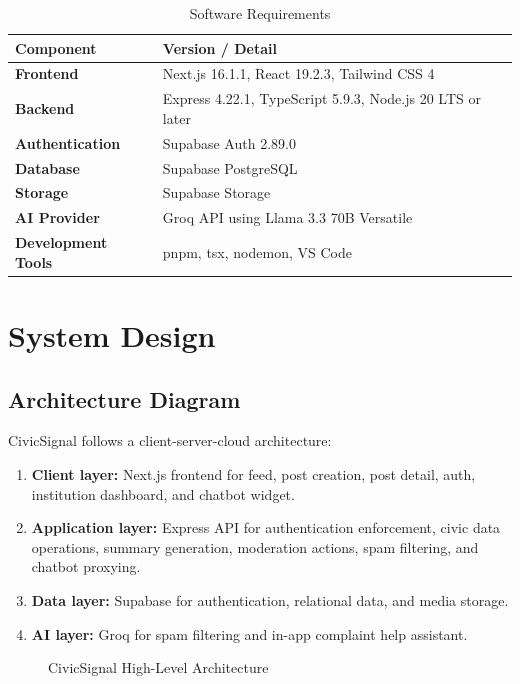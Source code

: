 \documentclass[12pt,a4paper]{report}
\begin{document}
\begin{table}[H]
\centering
\caption{Software Requirements}
\begin{tabularx}{\textwidth}{>{\bfseries}lX}
\toprule
Component & Version / Detail \\
\midrule
Frontend & Next.js 16.1.1, React 19.2.3, Tailwind CSS 4 \\
Backend & Express 4.22.1, TypeScript 5.9.3, Node.js 20 LTS or later \\
Authentication & Supabase Auth 2.89.0 \\
Database & Supabase PostgreSQL \\
Storage & Supabase Storage \\
AI Provider & Groq API using Llama 3.3 70B Versatile \\
Development Tools & pnpm, tsx, nodemon, VS Code \\
\bottomrule
\end{tabularx}
\end{table}

\chapter{System Design}
\section{Architecture Diagram}
CivicSignal follows a client-server-cloud architecture:
\begin{enumerate}
  \item \textbf{Client layer:} Next.js frontend for feed, post creation, post detail, auth, institution dashboard, and chatbot widget.
  \item \textbf{Application layer:} Express API for authentication enforcement, civic data operations, summary generation, moderation actions, spam filtering, and chatbot proxying.
  \item \textbf{Data layer:} Supabase for authentication, relational data, and media storage.
  \item \textbf{AI layer:} Groq for spam filtering and in-app complaint help assistant.
\end{enumerate}

\begin{figure}[H]
\centering
{}
\caption{CivicSignal High-Level Architecture}
\end{figure}
\end{document}
